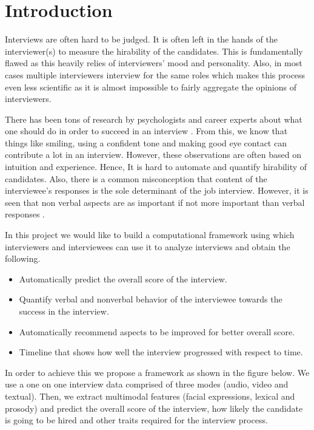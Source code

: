 \section{Introduction}
Interviews are often hard to be judged. It is often left in the hands of the interviewer(s) to measure the hirability of the candidates. This is fundamentally flawed as this heavily relies of interviewers' mood and personality. Also, in most cases multiple interviewers interview for the same roles which makes this process even less scientific as it is almost impossible to fairly aggregate the opinions of interviewers.

There has been tons of research by psychologists and career experts about what one should do in order to succeed in an interview \cite{huffcutt2001identification}. From this, we know that things like smiling, using a confident tone and making good eye contact can contribute a lot in an interview. However, these observations are often based on intuition and experience. Hence, It is hard to automate and quantify hirability of candidates. Also, there is a common misconception that content of the interviewee's responses is the sole determinant of the job interview. However, it is seen that non verbal aspects are as important if not more important than verbal responses \cite{notworking}.

In this project we would like to build a computational framework using which interviewers and interviewees can use it to analyze interviews and obtain the following.
\begin{itemize}
\item Automatically predict the overall score of the interview.
\item Quantify verbal and nonverbal behavior of the interviewee towards the success in the interview.
\item Automatically recommend aspects to be improved for better overall score. 
\item Timeline that shows how well the interview progressed with respect to time.
\end{itemize}

In order to achieve this we propose a framework as shown in the figure below. We use a one on one interview data comprised of three modes (audio, video and textual). Then, we extract multimodal features (facial expressions, lexical and prosody) and predict the overall score of the interview, how likely the candidate is going to be hired and other traits required for the interview process.
